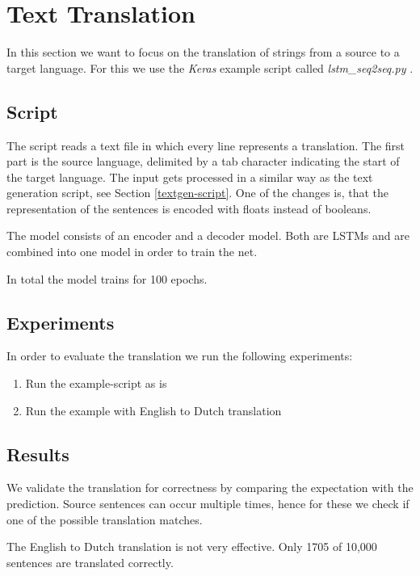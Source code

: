 \documentclass{article}[]
\begin{document}
\section{Text Translation}
\label{sec:trans}
In this section we want to focus on the translation of strings from a source to a target language.
For this we use the \emph{Keras} example script called \emph{lstm\_seq2seq.py} \cite{kerasexamples}.

\subsection{Script}
The script reads a text file in which every line represents a translation.
The first part is the source language, delimited by a tab character indicating the start of the target language.
The input gets processed in a similar way as the text generation script, see Section \ref{textgen-script}.
One of the changes is, that the representation of the sentences is encoded with floats instead of booleans.

The model consists of an encoder and a decoder model.
Both are LSTMs and are combined into one model in order to train the net.

In total the model trains for 100 epochs.

\subsection{Experiments}
In order to evaluate the translation we run the following experiments:

\begin{enumerate}
	\item{Run the example-script as is}
	\item{Run the example with English to Dutch translation}
\end{enumerate}

\subsection{Results}
We validate the translation for correctness by comparing the expectation with the prediction.
Source sentences can occur multiple times, hence for these we check if one of the possible translation matches.


The English to Dutch translation is not very effective.
Only 1705 of 10,000 sentences are translated correctly.
\end{document}
